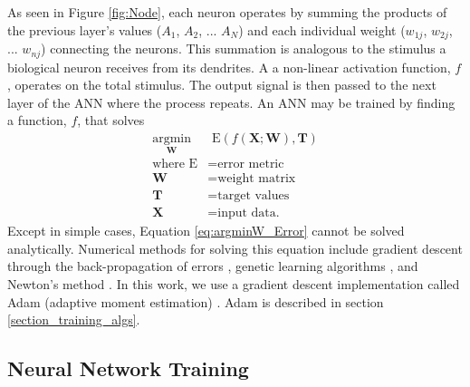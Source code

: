 As seen in Figure \ref{fig:Node}, each neuron operates by summing the products of the previous layer's values ($A{_1}$, $A{_2}$, ... $A{_N}$) and each individual weight ($w_{1j}$, $w_{2j}$, ... $w_{nj}$) connecting the neurons. This summation is analogous to the stimulus a biological neuron receives from its dendrites. A a non-linear activation function, $f$, operates on the total stimulus. The output signal is then passed to the next layer of the ANN where the process repeats. An ANN may be trained by finding a function, $f$, that solves
%
\begin{align} \label{eq:argminW_Error}
\underset{\mathbf{W}}{\text{argmin}} &{\text{ E}}(f(\mathbf{X} ; \mathbf{W} ) , \mathbf{T} ) \\
\text{where E} &= \text{error metric} \nonumber \\
\mathbf{W} &= \text{weight matrix} \nonumber \\
\mathbf{T} &= \text{target values} \nonumber \\
\mathbf{X} &= \text{input data.} \nonumber
\end{align}
%
Except in simple cases, Equation \ref{eq:argminW_Error} cannot be solved analytically. Numerical methods for solving this equation include gradient descent through the back-propagation of errors \cite{Rumelhart1986}, genetic learning algorithms \cite{Yao1999}, and Newton's method \cite{Fletcher2000}. In this work, we use a gradient descent implementation called Adam (adaptive moment estimation) \cite{Kingma2015}. Adam is described in section \ref{section_training_algs}.

\subsection{Neural Network Training}

